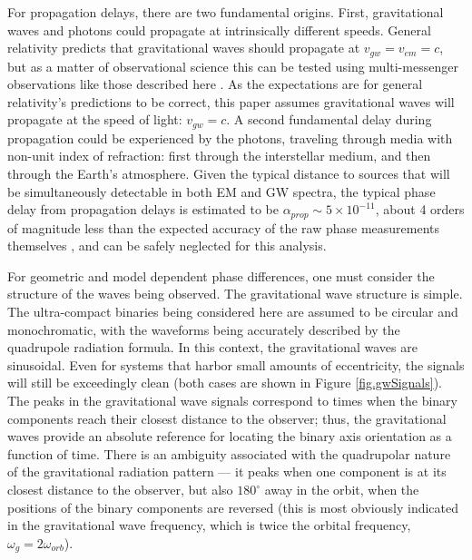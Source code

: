 \documentclass[preprint2]{aastex}
\begin{document}
For propagation delays, there are two fundamental origins.  First,
gravitational waves and photons could propagate at intrinsically
different speeds.  General relativity predicts that gravitational
waves should propagate at $v_{gw} = v_{em} = c$, but as a matter of
observational science this can be tested using multi-messenger
observations like those described here \citep{hazbounLarson2013}.  As
the expectations are for general relativity's predictions to be
correct, this paper assumes gravitational waves will propagate at the
speed of light: $v_{gw} = c$.  A second fundamental delay during
propagation could be experienced by the photons, traveling through
media with non-unit index of refraction: first through the
interstellar medium, and then through the Earth's atmosphere.  Given
the typical distance to sources that will be simultaneously detectable
in both EM and GW spectra, the typical phase delay from propagation
delays is estimated to be $\alpha_{prop} \sim 5 \times 10^{-11}$,
about 4 orders of magnitude less than the expected accuracy of the raw
phase measurements themselves \citep{gravitonSLL}, and can be safely
neglected for this analysis.

For geometric and model dependent phase differences, one must consider
the structure of the waves being observed.  The gravitational wave
structure is simple.  The ultra-compact binaries being considered here
are assumed to be circular and monochromatic, with the waveforms being
accurately described by the quadrupole radiation formula.  In this
context, the gravitational waves are sinusoidal.  Even for systems
that harbor small amounts of eccentricity, the signals will still be
exceedingly clean (both cases are shown in Figure
\ref{fig.gwSignals}).  The peaks in the gravitational wave signals
correspond to times when the binary components reach their closest distance to the observer; thus, the gravitational waves
provide an absolute reference for locating the binary axis orientation
as a function of time.  There is an ambiguity associated with the
quadrupolar nature of the gravitational radiation pattern --- it peaks
when one component is at its closest distance to the observer, but also $180^{\circ}$ away in the orbit, when
the positions of the binary components are reversed (this is most
obviously indicated in the gravitational wave frequency, which is
twice the orbital frequency, $\omega_{g} = 2 \omega_{orb}$).
\end{document}

